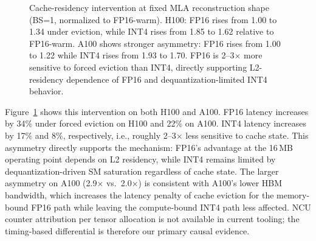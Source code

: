 \documentclass[10pt,twocolumn]{article}
\begin{document}
\begin{figure}[t]
\centering
{}
\caption{Cache-residency intervention at fixed MLA reconstruction shape (BS=1, normalized to FP16-warm).  H100: FP16 rises from 1.00 to 1.34 under eviction, while INT4 rises from 1.85 to 1.62 relative to FP16-warm.  A100 shows stronger asymmetry: FP16 rises from 1.00 to 1.22 while INT4 rises from 1.93 to 1.70.  FP16 is 2--3$\times$ more sensitive to forced eviction than INT4, directly supporting L2-residency dependence of FP16 and dequantization-limited INT4 behavior.}
\label{fig:cache_intervention}
\end{figure}

Figure~\ref{fig:cache_intervention} shows this intervention on both H100 and A100.  FP16 latency increases by 34\% under forced eviction on H100 and 22\% on A100.  INT4 latency increases by 17\% and 8\%, respectively, i.e., roughly 2--3$\times$ less sensitive to cache state.  This asymmetry directly supports the mechanism: FP16's advantage at the 16\,MB operating point depends on L2 residency, while INT4 remains limited by dequantization-driven SM saturation regardless of cache state.  The larger asymmetry on A100 (2.9$\times$ vs.\ 2.0$\times$) is consistent with A100's lower HBM bandwidth, which increases the latency penalty of cache eviction for the memory-bound FP16 path while leaving the compute-bound INT4 path less affected.  NCU counter attribution per tensor allocation is not available in current tooling; the timing-based differential is therefore our primary causal evidence.
\end{document}

